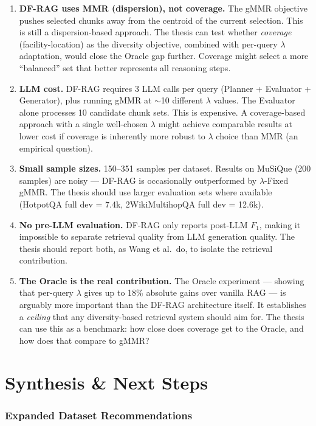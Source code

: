 \documentclass[11pt,a4paper]{article}
\begin{document}
\begin{enumerate}[leftmargin=*]
	\item \textbf{DF-RAG uses MMR (dispersion), not coverage.} The gMMR objective pushes selected chunks away from the centroid of the current selection. This is still a dispersion-based approach. The thesis can test whether \emph{coverage} (facility-location) as the diversity objective, combined with per-query $\lambda$ adaptation, would close the Oracle gap further. Coverage might select a more ``balanced'' set that better represents all reasoning steps.
	\item \textbf{LLM cost.} DF-RAG requires 3 LLM calls per query (Planner + Evaluator + Generator), plus running gMMR at $\sim$10 different $\lambda$ values. The Evaluator alone processes 10 candidate chunk sets. This is expensive. A coverage-based approach with a single well-chosen $\lambda$ might achieve comparable results at lower cost if coverage is inherently more robust to $\lambda$ choice than MMR (an empirical question).
	\item \textbf{Small sample sizes.} 150--351 samples per dataset. Results on MuSiQue (200 samples) are noisy --- DF-RAG is occasionally outperformed by $\lambda$-Fixed gMMR. The thesis should use larger evaluation sets where available (HotpotQA full dev = 7.4k, 2WikiMultihopQA full dev = 12.6k).
	\item \textbf{No pre-LLM evaluation.} DF-RAG only reports post-LLM $F_1$, making it impossible to separate retrieval quality from LLM generation quality. The thesis should report both, as Wang et al.\ do, to isolate the retrieval contribution.
	\item \textbf{The Oracle is the real contribution.} The Oracle experiment --- showing that per-query $\lambda$ gives up to 18\% absolute gains over vanilla RAG --- is arguably more important than the DF-RAG architecture itself. It establishes a \emph{ceiling} that any diversity-based retrieval system should aim for. The thesis can use this as a benchmark: how close does coverage get to the Oracle, and how does that compare to gMMR?
\end{enumerate}

\newpage
\part{Synthesis \& Next Steps}

\section{Expanded Dataset Recommendations}
\end{document}
